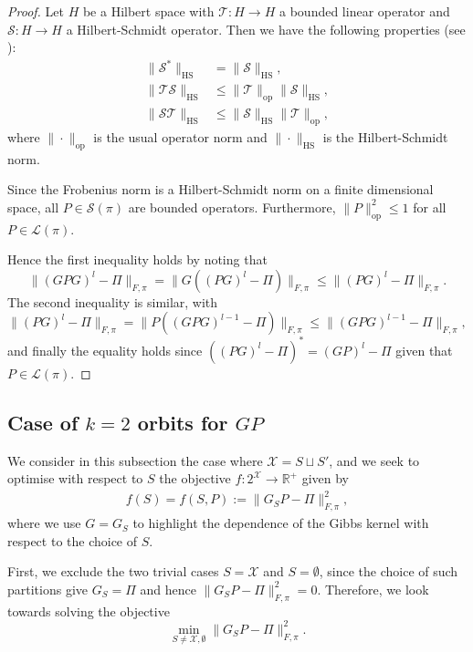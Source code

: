 \documentclass[EJP]{ejpecp} %
\begin{document}
\begin{proof}
    Let $H$ be a Hilbert space with $\mathcal{T}:H \to H$ a bounded linear operator and $\mathcal{S}: H \to H$ a Hilbert-Schmidt operator. Then we have the following properties (see \cite{conwayfunctional}):
    \begin{align*}
        \|\mathcal{S}^*\|_{\mathrm{HS}} &= \|\mathcal{S}\|_{\mathrm{HS}},\\
        \|\mathcal{TS}\|_{\mathrm{HS}} &\leq \|\mathcal{T}\|_{\mathrm{op}}\|\mathcal{S}\|_{\mathrm{HS}},\\
        \|\mathcal{ST}\|_{\mathrm{HS}} &\leq \|\mathcal{S}\|_{\mathrm{HS}}\|\mathcal{T}\|_{\mathrm{op}},
    \end{align*}
    where $\| \cdot \|_{\mathrm{op}}$ is the usual operator norm and $\|\cdot \|_{\mathrm{HS}}$ is the Hilbert-Schmidt norm. 

    Since the Frobenius norm is a Hilbert-Schmidt norm on a finite dimensional space, all $P \in \mathcal{S}(\pi)$ are bounded operators. Furthermore, $\|P\|_{\mathrm{op}}^2 \leq 1$ for all $P \in \mathcal{L}(\pi)$.

    Hence the first inequality holds by noting that 
    $$\|(GPG)^l - \Pi\|_{F, \pi} = \|G((PG)^l - \Pi)\|_{F, \pi} \leq \|(PG)^l - \Pi\|_{F, \pi}.$$
    The second inequality is similar, with
    $$\|(PG)^l - \Pi\|_{F, \pi} = \|P((GPG)^{l-1} - \Pi)\|_{F, \pi} \leq \|(GPG)^{l-1} - \Pi\|_{F, \pi},$$
    and finally the equality holds since $((PG)^l - \Pi)^* = (GP)^l - \Pi$ given that $P \in \mathcal{L}(\pi).$
\end{proof}

\subsection{Case of $k=2$ orbits for $GP$} \label{sec:GP_k=2}
We consider in this subsection the case where $\mathcal{X} = S \sqcup S'$, and we seek to optimise with respect to $S$ the objective $f : 2^{\mathcal{X}} \to \mathbb{R}^+$ given by
\begin{align}\label{eq:f(S)}
    f(S) = f(S,P) := \|G_S P - \Pi\|_{F, \pi}^2,
\end{align}
where we use $G = G_S$ to highlight the dependence of the Gibbs kernel with respect to the choice of $S$. 

First, we exclude the two trivial cases $S = \mathcal{X}$ and $S = \emptyset$, since the choice of such partitions give $G_S = \Pi$ and hence $\|G_S P - \Pi\|_{F, \pi}^2 =0$. Therefore, we look towards solving the objective
\begin{equation}\label{eq:GP obj}
    \min_{S \neq \mathcal{X}, \emptyset} \|G_S P - \Pi\|_{F, \pi}^2.
\end{equation}
\end{document}
